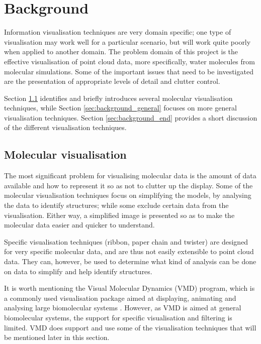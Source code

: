 \graphicspath{{./background/}}

\chapter{Background}
\label{cha:background}


Information visualisation techniques are very domain specific; one type of
visualisation may work well for a particular scenario, but will work quite
poorly when applied to another domain. The problem domain of this project is
the effective visualisation of point cloud data, more specifically, water
molecules from molecular simulations. Some of the important issues that need to
be investigated are the presentation of appropriate levels of detail and
clutter control.

Section \ref{sec:background_molecular} identifies and briefly introduces
several molecular visualisation techniques, while Section
\ref{sec:background_general} focuses on more general visualisation techniques.
Section \ref{sec:background_end} provides a short discussion of the different
visualisation techniques.


\section{Molecular visualisation}
\label{sec:background_molecular}


The most significant problem for visualising molecular data is the amount of
data available and how to represent it so as not to clutter up the display.
Some of the molecular visualisation techniques focus on simplifying the models,
by analysing the data to identify structures; while some exclude certain data
from the visualisation. Either way, a simplified image is presented so as to
make the molecular data easier and quicker to understand.

Specific visualisation techniques (ribbon, paper chain and twister) are
designed for very specific molecular data, and are thus not easily extensible
to point cloud data. They can, however, be used to determine what kind of
analysis can be done on data to simplify and help identify structures.

It is worth mentioning the Visual Molecular Dynamics (VMD) \citep{humphrey96}
program, which is a commonly used visualisation package aimed at displaying,
animating and analysing large biomolecular systems \citep{VMD}. However, as VMD
is aimed at general biomolecular systems, the support for specific
visualisation and filtering is limited. VMD does support and use some of the
visualisation techniques that will be mentioned later in this section.

